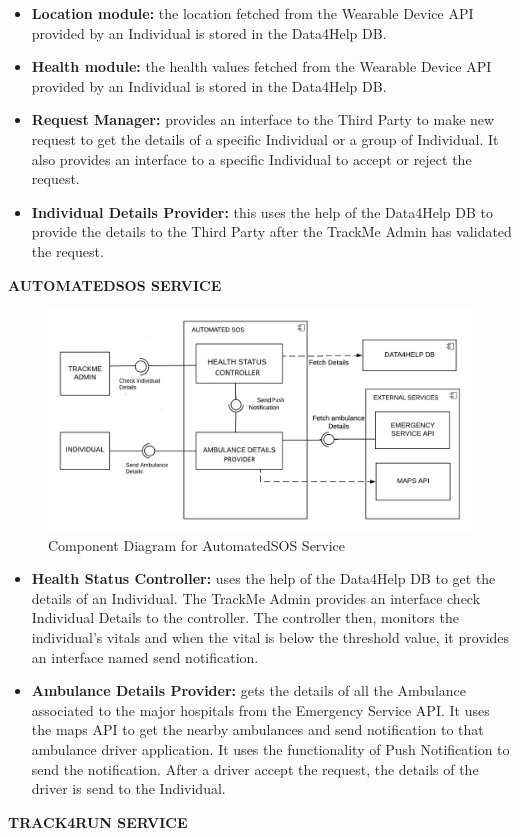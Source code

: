 \begin{itemize}
\item\textbf{Location module:}  the location fetched from the Wearable Device API provided by an Individual is stored in the Data4Help DB.
\item\textbf{Health module:}  the health values fetched from the Wearable Device API provided by an Individual is stored in the Data4Help DB.
\item\textbf{Request Manager:}  provides an interface to the Third Party to make new request to get the details of a specific Individual or a group of Individual. It also provides an interface to a specific Individual to accept or reject the request.
\item\textbf{Individual Details Provider:} this uses the  help of the Data4Help DB to provide the details to the Third Party after the TrackMe Admin has validated the request.
\newline
\end{itemize}
\textbf{AUTOMATEDSOS SERVICE}
\begin{figure}[H]
	\begin{center}
		\includegraphics[width=\textwidth]{./DD_Diagrams/ComponentAutomatedSOS.jpg}
      	\caption{Component Diagram for AutomatedSOS Service}
        \label{TrackMe_c2}
	\end{center}
\end{figure}

\begin{itemize}
\item\textbf{Health Status Controller:}  uses the help of the Data4Help DB to get the details of an Individual. The TrackMe Admin provides an interface check Individual Details to the controller. The controller then, monitors the individual's vitals and when the vital is below the threshold value, it provides an interface named send notification.  
\item\textbf{Ambulance Details Provider:} gets the details of all the Ambulance associated to the major hospitals from the Emergency Service API. It uses the maps API to get the nearby ambulances and send notification to that ambulance driver application. It uses the functionality of Push Notification to send the notification. After a driver accept the request, the details of the driver is send to the Individual. 
\newline
\end{itemize}
\textbf{TRACK4RUN SERVICE}

